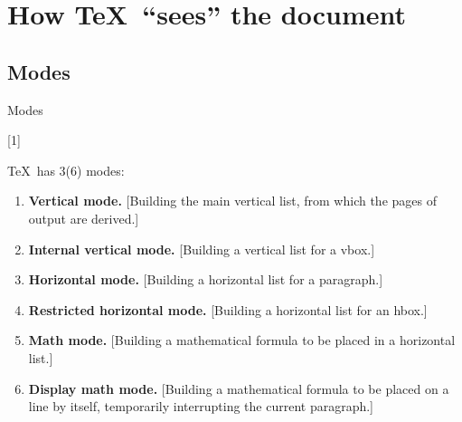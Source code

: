 \graphicspath{{sec1/images/}{sec1/code/}}
\lstset{inputpath=sec/code1/}

\section{How \TeX\ ``sees'' the document}


\subsection{Modes}

\begin{frame}[fragile]{Modes}\relax

    \cprotect{}[1]
    
        \TeX\ has 3(6) modes:
    \begin{enumerate}
        \item {\bfseries {\csk Vertical} mode.} [Building the main vertical list, from which the pages of
    output are derived.]
    \item {\bfseries Internal {\csk vertical} mode.} [Building a vertical list for a vbox.]
    \item {\bfseries {\csk Horizontal} mode.} [Building a horizontal list for a paragraph.]
    \item {\bfseries Restricted {\csk horizontal} mode.} [Building a horizontal list for an hbox.]
    \item {\bfseries {\csk Math} mode.} [Building a mathematical formula to be placed in a horizontal list.]
    \item {\bfseries Display {\csk math} mode.} [Building a mathematical formula to be placed on
    a line by itself, temporarily interrupting the current paragraph.]
         
    \end{enumerate}
     

     
\end{frame}


